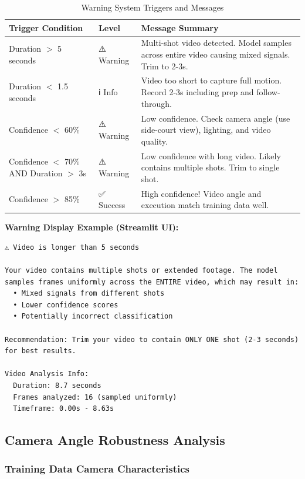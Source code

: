 \documentclass[11pt,a4paper]{article}
\begin{document}
\begin{table}[H]
\centering
\caption{Warning System Triggers and Messages}
\small
\begin{tabular}{llp{5cm}}
\toprule
Trigger Condition & Level & Message Summary \\
\midrule
Duration $>$ 5 seconds & ⚠️ Warning & Multi-shot video detected. Model samples across entire video causing mixed signals. Trim to 2-3s. \\
Duration $<$ 1.5 seconds & ℹ️ Info & Video too short to capture full motion. Record 2-3s including prep and follow-through. \\
Confidence $<$ 60\% & ⚠️ Warning & Low confidence. Check camera angle (use side-court view), lighting, and video quality. \\
Confidence $<$ 70\% AND Duration $>$ 3s & ⚠️ Warning & Low confidence with long video. Likely contains multiple shots. Trim to single shot. \\
Confidence $>$ 85\% & ✅ Success & High confidence! Video angle and execution match training data well. \\
\bottomrule
\end{tabular}
\end{table}

\textbf{Warning Display Example (Streamlit UI):}

\begin{verbatim}
⚠️ Video is longer than 5 seconds

Your video contains multiple shots or extended footage. The model
samples frames uniformly across the ENTIRE video, which may result in:
  • Mixed signals from different shots
  • Lower confidence scores
  • Potentially incorrect classification

Recommendation: Trim your video to contain ONLY ONE shot (2-3 seconds)
for best results.

Video Analysis Info:
  Duration: 8.7 seconds
  Frames analyzed: 16 (sampled uniformly)
  Timeframe: 0.00s - 8.63s
\end{verbatim}

\subsection{Camera Angle Robustness Analysis}

\subsubsection{Training Data Camera Characteristics}
\end{document}

